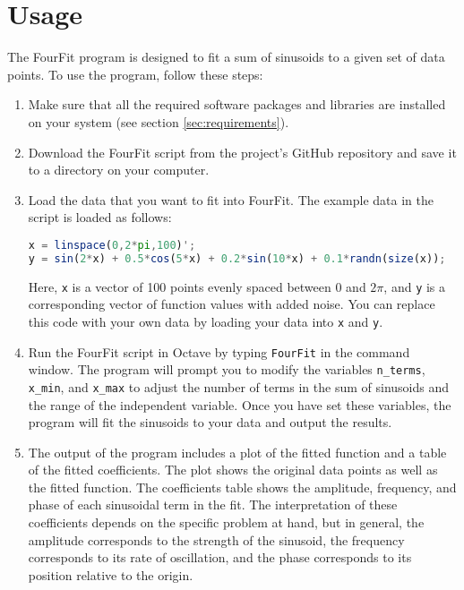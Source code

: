\documentclass{article}
\begin{document}
\section{Usage}
The FourFit program is designed to fit a sum of sinusoids to a given set of data points. To use the program, follow these steps:

\begin{enumerate}
\item Make sure that all the required software packages and libraries are installed on your system (see section \ref{sec:requirements}).
\item Download the FourFit script from the project's GitHub repository and save it to a directory on your computer.
\item Load the data that you want to fit into FourFit. The example data in the script is loaded as follows:
\begin{lstlisting}[language=Octave]
x = linspace(0,2*pi,100)';
y = sin(2*x) + 0.5*cos(5*x) + 0.2*sin(10*x) + 0.1*randn(size(x));
\end{lstlisting}

Here, \texttt{x} is a vector of 100 points evenly spaced between 0 and $2\pi$, and \texttt{y} is a corresponding vector of function values with added noise. You can replace this code with your own data by loading your data into \texttt{x} and \texttt{y}.

\item Run the FourFit script in Octave by typing \texttt{FourFit} in the command window. The program will prompt you to modify the variables \texttt{n\_terms}, \texttt{x\_min}, and \texttt{x\_max} to adjust the number of terms in the sum of sinusoids and the range of the independent variable. Once you have set these variables, the program will fit the sinusoids to your data and output the results.

\item The output of the program includes a plot of the fitted function and a table of the fitted coefficients. The plot shows the original data points as well as the fitted function. The coefficients table shows the amplitude, frequency, and phase of each sinusoidal term in the fit. The interpretation of these coefficients depends on the specific problem at hand, but in general, the amplitude corresponds to the strength of the sinusoid, the frequency corresponds to its rate of oscillation, and the phase corresponds to its position relative to the origin.
\end{enumerate}
\end{document}

